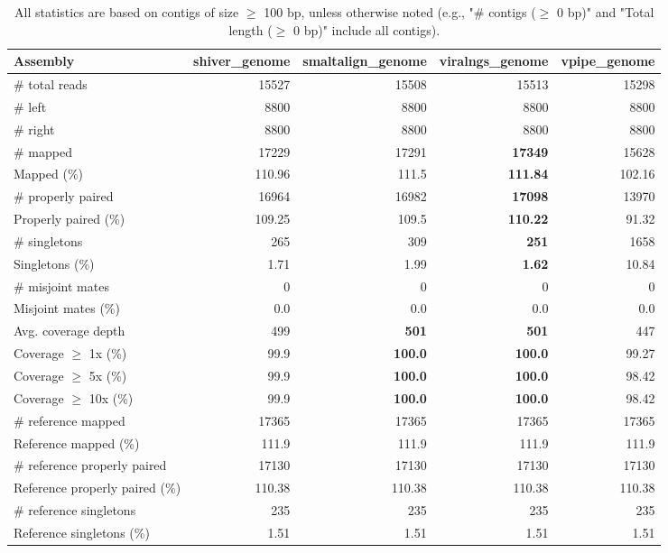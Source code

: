 \documentclass[12pt,a4paper]{article}
\begin{document}
\begin{table}[ht]
\begin{center}
\caption{All statistics are based on contigs of size $\geq$ 100 bp, unless otherwise noted (e.g., "\# contigs ($\geq$ 0 bp)" and "Total length ($\geq$ 0 bp)" include all contigs).}
\begin{tabular}{|l*{4}{|r}|}
\hline
Assembly & shiver\_genome & smaltalign\_genome & viralngs\_genome & vpipe\_genome \\ \hline
\# total reads & 15527 & 15508 & 15513 & 15298 \\ \hline
\# left & 8800 & 8800 & 8800 & 8800 \\ \hline
\# right & 8800 & 8800 & 8800 & 8800 \\ \hline
\# mapped & 17229 & 17291 & {\bf 17349} & 15628 \\ \hline
Mapped (\%) & 110.96 & 111.5 & {\bf 111.84} & 102.16 \\ \hline
\# properly paired & 16964 & 16982 & {\bf 17098} & 13970 \\ \hline
Properly paired (\%) & 109.25 & 109.5 & {\bf 110.22} & 91.32 \\ \hline
\# singletons & 265 & 309 & {\bf 251} & 1658 \\ \hline
Singletons (\%) & 1.71 & 1.99 & {\bf 1.62} & 10.84 \\ \hline
\# misjoint mates & 0 & 0 & 0 & 0 \\ \hline
Misjoint mates (\%) & 0.0 & 0.0 & 0.0 & 0.0 \\ \hline
Avg. coverage depth & 499 & {\bf 501} & {\bf 501} & 447 \\ \hline
Coverage $\geq$ 1x (\%) & 99.9 & {\bf 100.0} & {\bf 100.0} & 99.27 \\ \hline
Coverage $\geq$ 5x (\%) & 99.9 & {\bf 100.0} & {\bf 100.0} & 98.42 \\ \hline
Coverage $\geq$ 10x (\%) & 99.9 & {\bf 100.0} & {\bf 100.0} & 98.42 \\ \hline
\# reference mapped & 17365 & 17365 & 17365 & 17365 \\ \hline
Reference mapped (\%) & 111.9 & 111.9 & 111.9 & 111.9 \\ \hline
\# reference properly paired & 17130 & 17130 & 17130 & 17130 \\ \hline
Reference properly paired (\%) & 110.38 & 110.38 & 110.38 & 110.38 \\ \hline
\# reference singletons & 235 & 235 & 235 & 235 \\ \hline
Reference singletons (\%) & 1.51 & 1.51 & 1.51 & 1.51 \\ \hline

\end{tabular}
\end{center}
\end{table}
\end{document}
